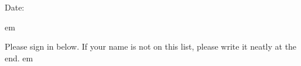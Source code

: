 \documentclass[letterpaper, 10pt]{article}
\begin{document}
\begin{multicols}{2}

  \noindent Date:

   em

  \noindent Please sign in below. If your name is not on this list, please write it neatly at the end.
   em


\end{multicols}
\end{document}
